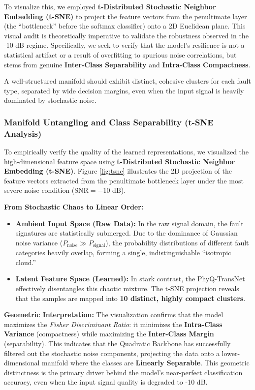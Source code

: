 \documentclass[5p,times,twocolumn]{elsarticle}
\begin{document}
To visualize this, we employed \textbf{t-Distributed Stochastic Neighbor Embedding (t-SNE)} to project the feature vectors from the penultimate layer (the ``bottleneck'' before the softmax classifier) onto a 2D Euclidean plane. This visual audit is theoretically imperative to validate the robustness observed in the -10 dB regime. Specifically, we seek to verify that the model's resilience is not a statistical artifact or a result of overfitting to spurious noise correlations, but stems from genuine \textbf{Inter-Class Separability} and \textbf{Intra-Class Compactness}.

A well-structured manifold should exhibit distinct, cohesive clusters for each fault type, separated by wide decision margins, even when the input signal is heavily dominated by stochastic noise.

\subsubsection{Manifold Untangling and Class Separability (t-SNE Analysis)}
To empirically verify the quality of the learned representations, we visualized the high-dimensional feature space using \textbf{t-Distributed Stochastic Neighbor Embedding (t-SNE)}. Figure \ref{fig:tsne} illustrates the 2D projection of the feature vectors extracted from the penultimate bottleneck layer under the most severe noise condition ($\text{SNR} = -10 \text{ dB}$).

\textbf{From Stochastic Chaos to Linear Order:}
\begin{itemize}
    \item \textbf{Ambient Input Space (Raw Data):} In the raw signal domain, the fault signatures are statistically submerged. Due to the dominance of Gaussian noise variance ($P_{\text{noise}} \gg P_{\text{signal}}$), the probability distributions of different fault categories heavily overlap, forming a single, indistinguishable ``isotropic cloud.''
    
    \item \textbf{Latent Feature Space (Learned):} In stark contrast, the PhyQ-TransNet effectively disentangles this chaotic mixture. The t-SNE projection reveals that the samples are mapped into \textbf{10 distinct, highly compact clusters}.
\end{itemize}



\textbf{Geometric Interpretation:}
The visualization confirms that the model maximizes the \textit{Fisher Discriminant Ratio}: it minimizes the \textbf{Intra-Class Variance} (compactness) while maximizing the \textbf{Inter-Class Margin} (separability). This indicates that the Quadratic Backbone has successfully filtered out the stochastic noise components, projecting the data onto a lower-dimensional manifold where the classes are \textbf{Linearly Separable}. This geometric distinctness is the primary driver behind the model's near-perfect classification accuracy, even when the input signal quality is degraded to -10 dB.
\end{document}
